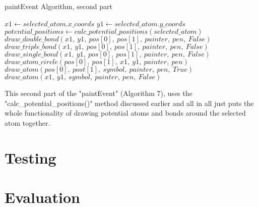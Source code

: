 \documentclass[a4paper,12pt]{article}
\begin{document}
\begin{algorithm}
\footnotesize
\caption{paintEvent Algorithm, second part}\label{alg:cap}
\begin{algorithmic}
	\State $ x1\gets selected\_atom.x\_coords$
	\State $ y1\gets selected\_atom.y\_coords$
		\State $ potential\_positions\gets calc\_potential\_positions(selected\_atom)$
					\State $ draw\_double\_bond(x1,\ y1,\ pos[0],\ pos[1],\ painter,\ pen,\ False)$
					\State $ draw\_triple\_bond(x1,\ y1,\ pos[0],\ pos[1],\ painter,\ pen,\ False)$
				\Else
					\State $ draw\_single\_bond(x1,\ y1,\ pos[0],\ pos[1],\ painter,\ pen,\ False)$
				\EndIf
				\State $ draw\_atom\_circle(pos[0],\ pos[1],\ x1,\ y1,\  painter,\ pen)$
				\State $ draw\_atom(pos[0],\ post[1],\ symbol,\ painter,\ pen,\ True)$
				\State $ draw\_atom(x1,\ y1,\ symbol,\ painter,\ pen,\ False)$
			\EndIf
		\EndFor
	\EndIf
	\EndIf
\EndIf
\end{algorithmic}
\end{algorithm}

This second part of the "paintEvent" (Algorithm 7), uses the\\
"calc\_potential\_positions()" method discussed earlier and all in all just puts the whole functionality of drawing potential atoms and bonds around the selected atom together.

\newpage

\section{Testing}

\section{Evaluation}
\newpage
\end{document}
